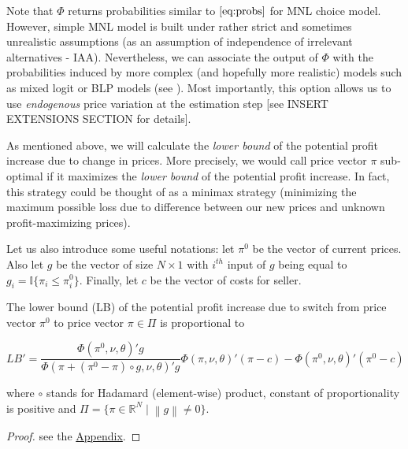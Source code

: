 \documentclass[12pt]{article}
\newcommand\norm[1]{\left\lVert#1\right\rVert}
\begin{document}
\par Note that $\Phi$ returns probabilities similar to $\ref{eq:probs}$ for MNL choice model.
However, simple MNL model is built under rather strict and sometimes unrealistic assumptions (as an assumption of independence of irrelevant alternatives - IAA).
Nevertheless, we can associate the output of $\Phi$ with the probabilities induced by more complex (and hopefully more realistic) models such as mixed logit or BLP models (see \cite{berry1995automobile}).
Most importantly, this option allows us to use \textit{endogenous} price variation at the estimation step [see INSERT EXTENSIONS SECTION for details].

\par As mentioned above, we will calculate the \textit{lower bound} of the potential profit increase due to change in prices.
More precisely, we would call price vector $\pi$ sub-optimal if it maximizes the \textit{lower bound} of the potential profit increase.
In fact, this strategy could be thought of as a minimax strategy (minimizing the maximum possible loss due to difference between our new prices and unknown profit-maximizing prices).

\par Let us also introduce some useful notations: let $\pi^0$ be the vector of current prices.
Also let $g$ be the vector of size $N \times 1$ with $i^{th}$ input of $g$ being equal to $g_i = \mathbb{I}\{\pi_i \leq \pi_i^0\}$.
Finally, let $c$ be the vector of costs for seller.

\begin{proposition}\label{proposition:1}

The lower bound (LB) of the potential profit increase due to switch from price vector $\pi^0$ to price vector $\pi \in \Pi$ is proportional to

\begin{equation*}
LB' = \frac{ \Phi(\pi^0,\nu, \theta)' g}{\Phi(\pi + (\pi^0 - \pi) \circ g,\nu, \theta)' g} \Phi(\pi,\nu, \theta)' (\pi-c) - \Phi(\pi^0,\nu, \theta)' (\pi^0 -c)
\end{equation*}

where $\circ$ stands for Hadamard (element-wise) product, constant of proportionality is positive and $\Pi = \{\pi \in  \mathbb{R}^N \mid \norm{g} \neq 0 \}$.

\end{proposition}
\begin{proof}
see the \hyperref[sect7]{Appendix}.
\end{proof}
\end{document}
